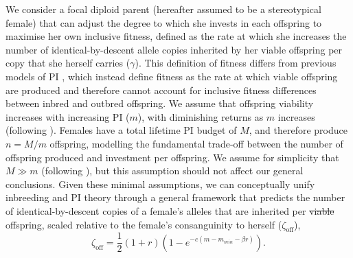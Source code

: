 \documentclass[12pt]{article}
\begin{document}
We consider a focal diploid parent (hereafter assumed to be a stereotypical female) that can adjust the degree to which she invests in each offspring to maximise her own inclusive fitness, defined as the rate at which she increases the number of identical-by-descent allele copies inherited by her viable offspring per copy that she herself carries ($\gamma$). This definition of fitness differs from previous models of PI \cite[][]{Macnair1978, Parker1978}, which instead define fitness as the rate at which viable offspring are produced and therefore cannot account for inclusive fitness differences between inbred and outbred offspring. We assume that offspring viability increases with increasing PI ($m$), with diminishing returns as $m$ increases (following \cite[][]{Parker1978}). Females have a total lifetime PI budget of $M$, and therefore produce $n=M/m$ offspring, modelling the fundamental trade-off between the number of offspring produced and investment per offspring. We assume for simplicity that $M \gg m$ (following \cite[][]{Parker1985}), but this assumption should not affect our general conclusions. Given these minimal assumptions, we can conceptually unify inbreeding and PI theory through a general framework that predicts the number of identical-by-descent copies of a female's alleles that are inherited per {\color{red}\st{viable}} offspring{\color{blue}, scaled relative to the female's consanguinity to herself} ($\zeta_{\textrm{off}}$),
\begin{equation} \label{maineq}
\zeta_{\textrm{off}} = \frac{1}{2}\left(1+r\right)\left(1-e^{-c\left(m-m_{min}-\beta r\right)}\right).
\end{equation}
\end{document}
